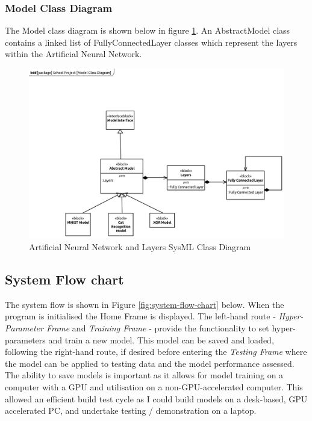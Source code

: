 \documentclass[./project-report/src/latex/project-report.tex]{subfiles}
\begin{document}
\subsubsection{Model Class Diagram}

The Model class diagram is shown below in figure \ref{fig:model-class-diagram}. An AbstractModel class contains a linked list of FullyConnectedLayer classes which represent 
the layers within the Artificial Neural Network.

\begin{figure}[h!]
\centering
\includegraphics[width=1\textwidth]{./project-report/src/images/model-class-diagram.png}
\caption{Artificial Neural Network and Layers SysML Class Diagram}
\label{fig:model-class-diagram}
\end{figure}

\pagebreak

\subsection{System Flow chart}

The system flow is shown in Figure \ref{fig:system-flow-chart} below. When the program is initialised the Home Frame is displayed. The left-hand route - 
\textit{Hyper-Parameter Frame} and \textit{Training Frame} - provide the functionality to set hyper-parameters and train a new model. This model can be saved and loaded, 
following the right-hand route, if desired before entering the \textit{Testing Frame} where the model can be applied to testing data and the model performance assessed. The 
ability to save models is important as it allows for model training on a computer with a GPU and utilisation on a non-GPU-accelerated computer. This allowed an efficient build test cycle as I could build models on a desk-based, GPU accelerated PC, and undertake testing / demonstration on a laptop.
\end{document}
